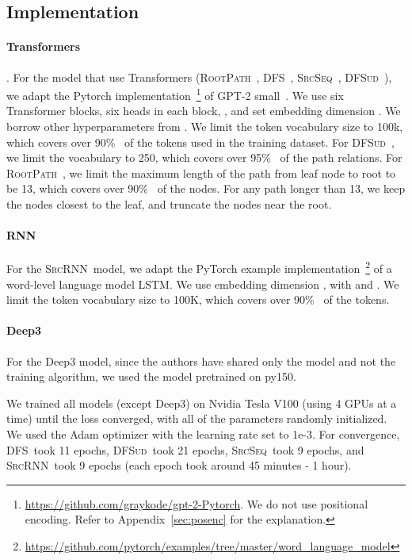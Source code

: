 \documentclass[nonacm, sigconf]{acmart}
\newcommand{\abbr}[1]{\textsc{#1}~}
\newcommand{\SrcSeq}{\abbr{SrcSeq}} \newcommand{\SrcRNN}{\abbr{SrcRNN}} \newcommand{\LeafSeq}{\abbr{LeafSeq}} \newcommand{\RootPath}{\abbr{RootPath}} \newcommand{\LeafTokens}{\abbr{LeafTokens}} \newcommand{\DFS}{\abbr{DFS}} \newcommand{\TreeRel}{\abbr{DFS{ud}}} \newcommand{\TreeReli}{\abbr{DFS{ud+}}}
\begin{document}
\subsection{Implementation}

\paragraph{Transformers}. For the model that use Transformers (\RootPath, \DFS, \SrcSeq, \TreeRel), we adapt the Pytorch implementation~\footnote{\url{https://github.com/graykode/gpt-2-Pytorch}. We do not use positional encoding. Refer to Appendix~\ref{sec:posenc} for the explanation.}  of GPT-2 small~\citep{radford2019language-gpt2}.
We use six Transformer blocks, six heads in each block, , and set embedding dimension . We borrow other hyperparameters from \citet{radford2019language-gpt2}.
We limit the token vocabulary size to 100k, which covers over 90\%~ of the tokens used in the training dataset.
For \TreeRel, we limit the vocabulary to 250, which covers over 95\%~ of the path relations. For \RootPath, we limit the maximum length of the path from leaf node to root to be 13, which covers over 90\%~ of the nodes. For any path longer than 13, we keep the nodes closest to the leaf, and truncate the nodes near the root.

\paragraph{RNN} For the \SrcRNN model, we adapt the PyTorch example implementation~\footnote{\url{https://github.com/pytorch/examples/tree/master/word_language_model}} of a word-level language model LSTM. We use embedding dimension , with  and . We limit the token vocabulary size to 100K, which covers over 90\%~ of the tokens.

\paragraph{Deep3} For the Deep3 model, since the authors have shared only the model and not the training algorithm, we used the model pretrained on py150.

We trained all models (except Deep3) on Nvidia Tesla V100 (using 4 GPUs at a time) until the loss converged, with all of the parameters randomly initialized. We used the Adam optimizer with the learning rate set to 1e-3. For convergence, \DFS took 11 epochs, \TreeRel took 21 epochs, \SrcSeq took 9 epochs, and \SrcRNN took 9 epochs (each epoch took around 45 minutes - 1 hour). 
\end{document}
